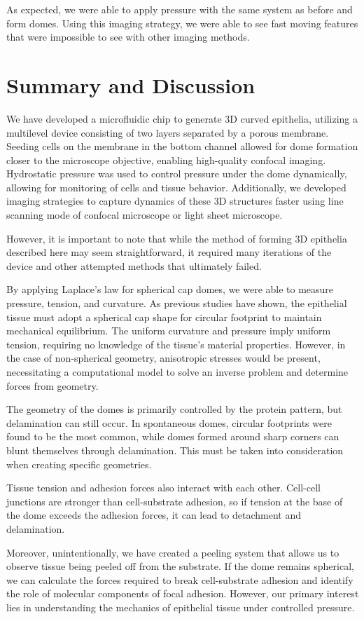 As expected, we were able to apply pressure with the same system as
before and form domes. Using this imaging strategy, we were able to see
fast moving features that were impossible to see with other imaging
methods.


\newpage
\hypertarget{summary-and-discussion}{%
\section{Summary and Discussion}\label{summary-and-discussion}}

We have developed a microfluidic chip to generate 3D curved epithelia, utilizing a multilevel device consisting of two layers separated by a porous membrane. Seeding cells on the membrane in the bottom channel allowed for dome formation closer to the microscope objective, enabling high-quality confocal imaging. Hydrostatic pressure was used to control pressure under the dome dynamically, allowing for monitoring of cells and tissue behavior. Additionally, we developed imaging strategies to capture dynamics of these 3D structures faster using line scanning mode of confocal microscope or light sheet microscope.  

However, it is important to note that while the method of forming 3D epithelia described here may seem straightforward, it required many iterations of the device and other attempted methods that ultimately failed.  

By applying Laplace's law for spherical cap domes, we were able to measure pressure, tension, and curvature. As previous studies have shown, the epithelial tissue must adopt a spherical cap shape for circular footprint to maintain mechanical equilibrium. The uniform curvature and pressure imply uniform tension, requiring no knowledge of the tissue's material properties. However, in the case of non-spherical geometry, anisotropic stresses would be present, necessitating a computational model to solve an inverse problem and determine forces from geometry.  

The geometry of the domes is primarily controlled by the protein pattern, but delamination can still occur. In spontaneous domes, circular footprints were found to be the most common, while domes formed around sharp corners can blunt themselves through delamination. This must be taken into consideration when creating specific geometries.  

Tissue tension and adhesion forces also interact with each other. Cell-cell junctions are stronger than cell-substrate adhesion, so if tension at the base of the dome exceeds the adhesion forces, it can lead to detachment and delamination.  

Moreover, unintentionally, we have created a peeling system that allows us to observe tissue being peeled off from the substrate. If the dome remains spherical, we can calculate the forces required to break cell-substrate adhesion and identify the role of molecular components of focal adhesion. However, our primary interest lies in understanding the mechanics of epithelial tissue under controlled pressure.

